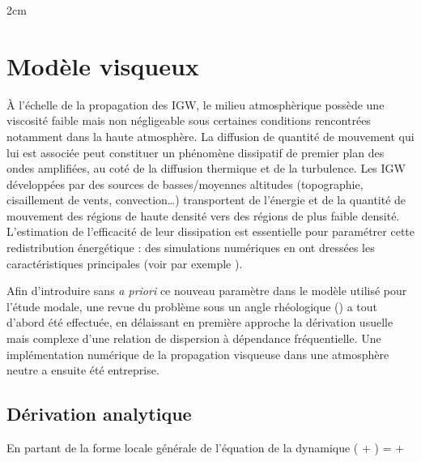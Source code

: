 \changepage{-3cm}%
           {}%
           {}%
           {}%
           {}%
           {2cm}%
           {}%
           {}%
           {}%
\section{Modèle visqueux}

À l'échelle de la propagation des IGW, le milieu atmosphèrique possède une viscosité faible mais non négligeable sous certaines conditions rencontrées notamment dans la haute atmosphère. La diffusion de quantité de mouvement qui lui est associée peut constituer un phénomène dissipatif de premier plan des ondes amplifiées, au coté de la diffusion thermique et de la turbulence. Les IGW développées par des sources de basses/moyennes altitudes (topographie, cisaillement de vents, convection…) transportent de l'énergie et de la quantité de mouvement des régions de haute densité vers des régions de plus faible densité. L'estimation de l'efficacité de leur dissipation est essentielle pour paramétrer cette redistribution énergétique : des simulations numériques en ont dressées les caractéristiques principales (voir par exemple \cite{Vadas2005}).

Afin d'introduire sans \emph{a priori} ce nouveau paramètre dans le modèle utilisé pour l'étude modale, une revue du problème sous un angle rhéologique (\cite{Gueguen1994}) a tout d'abord été effectuée, en délaissant en première approche la dérivation usuelle mais complexe d'une relation de dispersion à dépendance fréquentielle. Une implémentation numérique de la propagation visqueuse dans une atmosphère neutre a ensuite été entreprise.

\subsection{Dérivation analytique}

En partant de la forme locale générale de l'équation de la dynamique
\beq \quad \rho \left ( \delt \vv + \vv \cdot \gradient \vv \right ) = \divergence \Tctr + \vf \quad \label{eq:dynamique} \eeq


